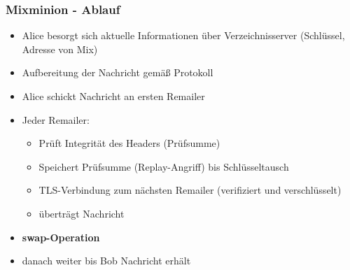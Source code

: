\documentclass{beamer}
\begin{document}
\begin{frame}
	\frametitle{Mixminion - Ablauf}
	
	\begin{itemize}
		\item Alice besorgt sich aktuelle Informationen über Verzeichnisserver (Schlüssel, Adresse von Mix)
		\item Aufbereitung der Nachricht gemäß Protokoll
		\item Alice schickt Nachricht an ersten Remailer
		\item Jeder Remailer:
		\begin{itemize}
			\item Prüft Integrität des Headers (Prüfsumme)
			\item Speichert Prüfsumme (Replay-Angriff) bis Schlüsseltausch
			\item TLS-Verbindung zum nächsten Remailer (verifiziert und verschlüsselt)
			\item überträgt Nachricht
		\end{itemize}
		\item \textbf{swap-Operation}
		\item danach weiter bis Bob Nachricht erhält
	\end{itemize}
\end{frame}
\end{document}
